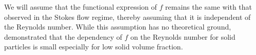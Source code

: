 








We will assume that the functional expression of $f$ remains the same with that observed in the Stokes flow regime, thereby assuming that it is independent of the Reynolds number. While this assumption has no theoretical ground, \citet{di1994} demonstrated that the dependency of $f$ on the Reynolds number for solid particles is small especially for low solid volume fraction.






